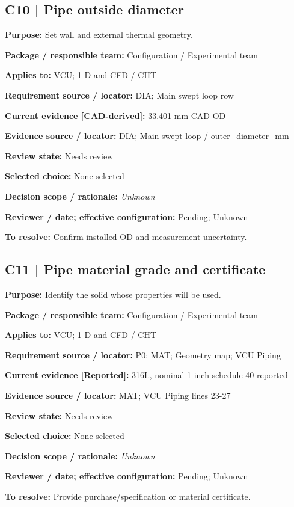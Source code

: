 \documentclass[11pt]{article}
\begin{document}
\begin{minipage}{\textwidth}\small\setlength{\parskip}{2pt}
\subsection*{C10 | Pipe outside diameter}
\textbf{Purpose:} Set wall and external thermal geometry.\par
\textbf{Package / responsible team:} Configuration / Experimental team\par
\textbf{Applies to:} VCU; 1-D and CFD / CHT\par
\textbf{Requirement source / locator:} DIA; Main swept loop row\par
\textbf{Current evidence [CAD-derived]:} 33.401 mm CAD OD\par
\textbf{Evidence source / locator:} DIA; Main swept loop / outer\_\allowbreak{}diameter\_\allowbreak{}mm\par
\textbf{Review state:} Needs review\par
\textbf{Selected choice:} None selected\par
\textbf{Decision scope / rationale:} \textit{Unknown}\par
\textbf{Reviewer / date; effective configuration:} Pending; Unknown\par
\textbf{To resolve:} Confirm installed OD and measurement uncertainty.\par
\end{minipage}\par\vspace{5pt}
\begin{minipage}{\textwidth}\small\setlength{\parskip}{2pt}
\subsection*{C11 | Pipe material grade and certificate}
\textbf{Purpose:} Identify the solid whose properties will be used.\par
\textbf{Package / responsible team:} Configuration / Experimental team\par
\textbf{Applies to:} VCU; 1-D and CFD / CHT\par
\textbf{Requirement source / locator:} P0; MAT; Geometry map; VCU Piping\par
\textbf{Current evidence [Reported]:} 316L, nominal 1-inch schedule 40 reported\par
\textbf{Evidence source / locator:} MAT; VCU Piping lines 23-27\par
\textbf{Review state:} Needs review\par
\textbf{Selected choice:} None selected\par
\textbf{Decision scope / rationale:} \textit{Unknown}\par
\textbf{Reviewer / date; effective configuration:} Pending; Unknown\par
\textbf{To resolve:} Provide purchase/specification or material certificate.\par
\end{minipage}\par\vspace{5pt}
\end{document}
